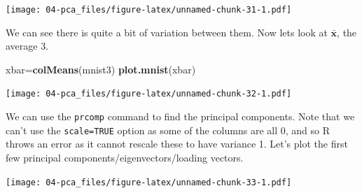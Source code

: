 \documentclass[
]{book}
\newenvironment{Shaded}{\begin{snugshade}}{\end{snugshade}}
\newcommand{\AttributeTok}[1]{\textcolor[rgb]{0.13,0.29,0.53}{#1}}
\newcommand{\CommentTok}[1]{\textcolor[rgb]{0.56,0.35,0.01}{\textit{#1}}}
\newcommand{\DecValTok}[1]{\textcolor[rgb]{0.00,0.00,0.81}{#1}}
\newcommand{\FunctionTok}[1]{\textcolor[rgb]{0.13,0.29,0.53}{\textbf{#1}}}
\newcommand{\NormalTok}[1]{#1}
\newcommand{\OtherTok}[1]{\textcolor[rgb]{0.56,0.35,0.01}{#1}}
\newcommand{\SpecialCharTok}[1]{\textcolor[rgb]{0.81,0.36,0.00}{\textbf{#1}}}
\newcommand{\StringTok}[1]{\textcolor[rgb]{0.31,0.60,0.02}{#1}}
\theoremstyle{definition}
\theoremstyle{definition}
\theoremstyle{definition}
\theoremstyle{definition}
\theoremstyle{remark}
\begin{document}
\begin{Shaded}
\end{Shaded}

\texttt{[image: 04-pca\_files/figure-latex/unnamed-chunk-31-1.pdf]}

We can see there is quite a bit of variation between them.
Now lets look at \(\bar{\mathbf x}\), the average 3.

\begin{Shaded}
\begin{Highlighting}[]
\NormalTok{xbar}\OtherTok{=}\FunctionTok{colMeans}\NormalTok{(mnist3)}
\FunctionTok{plot.mnist}\NormalTok{(xbar)}
\end{Highlighting}
\end{Shaded}

\texttt{[image: 04-pca\_files/figure-latex/unnamed-chunk-32-1.pdf]}

We can use the \texttt{prcomp} command to find the principal components. Note that we can't use the \texttt{scale=TRUE} option as some of the columns are all 0, and so R throws an error as it cannot rescale these to have variance 1. Let's plot the first few principal components/eigenvectors/loading vectors.

\begin{Shaded}
\end{Shaded}

\texttt{[image: 04-pca\_files/figure-latex/unnamed-chunk-33-1.pdf]}
\end{document}
